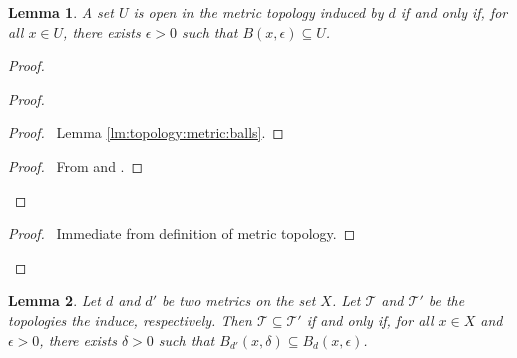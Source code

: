 \documentclass{report}
\let\qed\relax
\newtheorem{lm}{Lemma}[section]
\theoremstyle{definition}
\begin{document}
  \begin{lm}
    \label{lm:topology:metric:open}
    A set $U$ is open in the metric topology induced by $d$ if and only if, for
    all $x \in U$, there exists $\epsilon > 0$ such that $B(x, \epsilon)
    \subseteq
    U$.
  \end{lm}

  \begin{proof}
    \pf
    \begin{proof}
      \begin{proof}
        \pf\ Lemma \ref{lm:topology:metric:balls}.
      \end{proof}
      \begin{proof}
        \pf\ From  and .
      \end{proof}
    \end{proof}
    \begin{proof}
      \pf\ Immediate from definition of metric topology.
    \end{proof}
    \qed
  \end{proof}

  \begin{lm}
    Let $d$ and $d'$ be two metrics on the set $X$. Let $\mathcal{T}$ and
    $\mathcal{T}'$ be the topologies the induce, respectively. Then
    $\mathcal{T} \subseteq \mathcal{T}'$ if and only if, for all $x \in X$ and
    $\epsilon > 0$, there exists $\delta > 0$ such that $B_{d'}(x, \delta)
    \subseteq B_d(x, \epsilon)$.
  \end{lm}
\end{document}
